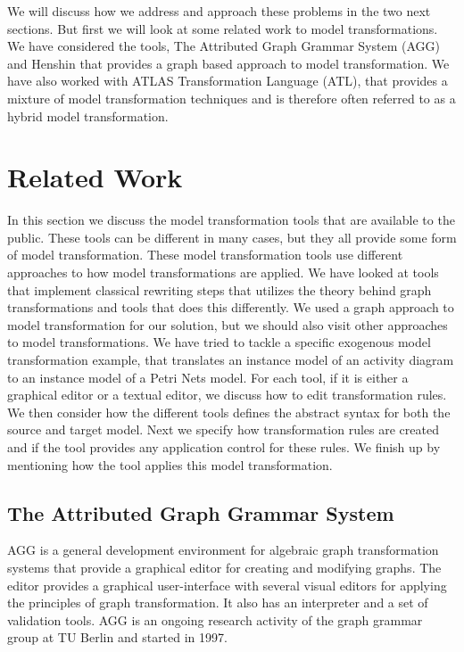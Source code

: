 We will discuss how we address and approach these problems in the two next
sections. But first we will look at some related work to model transformations.
We have considered the tools, The Attributed Graph Grammar System\cite{AGG}
(AGG) and Henshin\cite{Henshin_2010} that provides a graph based approach to
model transformation. We have also worked with ATLAS Transformation
Language\cite{ATL_USERMAN} (ATL), that provides a mixture of model
transformation techniques and is therefore often referred to as a hybrid model
transformation.

\section{Related Work}

In this section we discuss the model transformation tools that are available to
the public. These tools can be different in many cases, but they all provide
some form of model transformation. These model transformation tools use
different approaches to how model transformations are applied. We have looked at
tools that implement classical rewriting steps that utilizes the theory behind
graph transformations and tools that does this differently. We used a graph
approach to model transformation for our solution, but we should also visit
other approaches to model transformations. We have tried to tackle a specific
exogenous model transformation example, that translates an instance model of an
activity diagram to an instance model of a Petri Nets\cite{jensen2007coloured}
model. For each tool, if it is either a graphical editor or a textual editor, we
discuss how to edit transformation rules. We then consider how the different
tools defines the abstract syntax for both the source and target model. Next we
specify how transformation rules are created and if the tool provides any
application control for these rules. We finish up by mentioning how the
tool applies this model transformation. 

\subsection{The Attributed Graph Grammar System}

AGG is a general development environment for algebraic graph
transformation systems that provide a graphical editor for creating
and modifying graphs. The editor provides a graphical user-interface with
several visual editors for applying the principles of graph transformation. It
also has an interpreter and a set of validation tools. AGG is an ongoing
research activity of the graph grammar group at TU Berlin and started in 1997.

